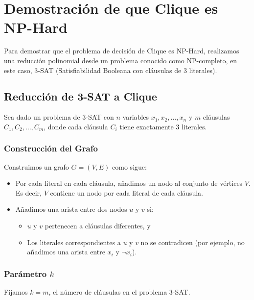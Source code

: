 \documentclass[12pt]{article}
\begin{document}
\section*{Demostración de que Clique es NP-Hard}
Para demostrar que el problema de decisión de Clique es NP-Hard, realizamos una reducción polinomial desde un problema conocido como NP-completo, en este caso, 3-SAT (Satisfiabilidad Booleana con cláusulas de 3 literales).

\subsection*{Reducción de 3-SAT a Clique}
Sea dado un problema de 3-SAT con $n$ variables $x_1, x_2, \ldots, x_n$ y $m$ cláusulas $C_1, C_2, \ldots, C_m$, donde cada cláusula $C_i$ tiene exactamente 3 literales.

\subsubsection*{Construcción del Grafo}
Construimos un grafo $G = (V, E)$ como sigue:
\begin{itemize}
    \item Por cada literal en cada cláusula, añadimos un nodo al conjunto de vértices $V$. Es decir, $V$ contiene un nodo por cada literal de cada cláusula.
    \item Añadimos una arista entre dos nodos $u$ y $v$ si:
    \begin{itemize}
        \item $u$ y $v$ pertenecen a cláusulas diferentes, y
        \item Los literales correspondientes a $u$ y $v$ no se contradicen (por ejemplo, no añadimos una arista entre $x_i$ y $\neg x_i$).
    \end{itemize}
\end{itemize}

\subsubsection*{Parámetro $k$}
Fijamos $k = m$, el número de cláusulas en el problema 3-SAT.
\end{document}
